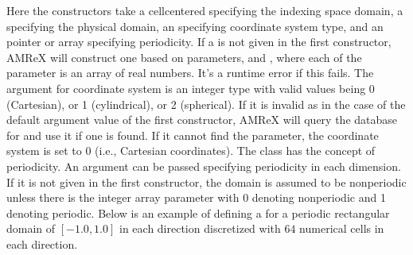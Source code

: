\documentclass[letterpaper,10pt,english]{sphinxmanual}
\begin{document}
\sphinxAtStartPar
Here the constructors take a cell\sphinxhyphen{}centered  specifying the indexing
space domain, a  specifying the
physical domain, an  specifying coordinate system type, and
an  pointer or array specifying periodicity. If a  is not
given in the first constructor, AMReX  will construct one based on  parameters,
 and , where each of the parameter is
an array of  real numbers. It’s a runtime error if this
fails. The argument for coordinate system is an integer type with
valid values being 0 (Cartesian), or 1 (cylindrical), or 2 (spherical). If it
is invalid as in the case of the default argument value of the first constructor, AMReX will query the
 database for  and use it if one is
found. If it cannot find the parameter, the coordinate system is set to 0
(i.e., Cartesian coordinates). The  class has the concept of
periodicity.  An argument can be passed specifying periodicity in each
dimension. If it is not given in the first constructor, the domain is assumed to be non\sphinxhyphen{}periodic unless
there is the  integer array parameter 
with 0 denoting non\sphinxhyphen{}periodic and 1 denoting periodic. Below is an example of
defining a  for a periodic rectangular domain of
\([-1.0,1.0]\) in each direction discretized with \(64\) numerical
cells in each direction.
\end{document}
